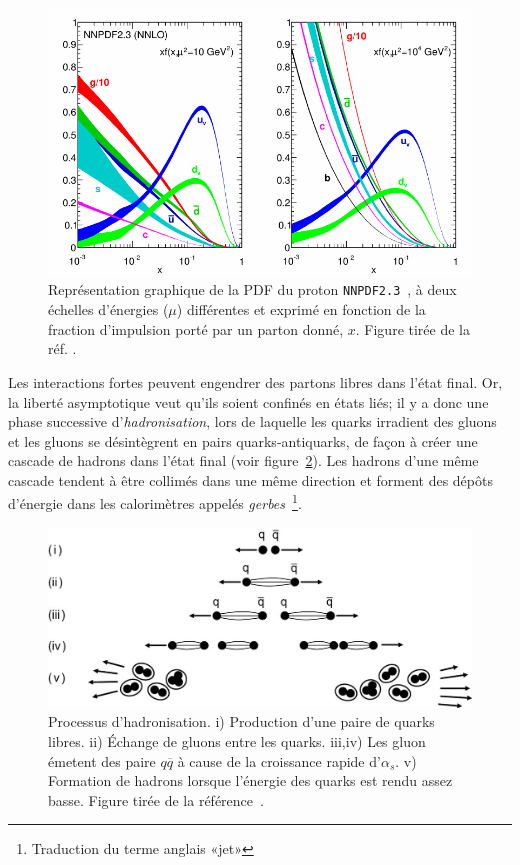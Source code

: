 \begin{figure}
  \centering
  \includegraphics{nnpdf23.pdf}
  \caption{Représentation graphique de la PDF du proton
    \texttt{NNPDF2.3}~\cite{ball_parton_2013}, à deux échelles
    d'énergies ($\mu$) différentes et exprimé en fonction de la
    fraction d'impulsion porté par un parton donné, $x$. Figure tirée de la
    réf. \cite{olive_qcd_2014}.}
  \label{fig:pdf}
\end{figure}

Les interactions fortes peuvent engendrer des partons libres dans l'état
final. Or, la liberté asymptotique veut qu'ils soient confinés en
états liés; il y a donc une phase successive d'\emph{hadronisation},
lors de laquelle les quarks irradient des gluons et les gluons se
désintègrent en pairs quarks-antiquarks, de façon à créer une cascade
de hadrons dans l'état final (voir
figure~\ref{fig:hadronisation}). Les hadrons d'une même cascade
tendent à être collimés dans une même direction et forment des
dépôts d'énergie dans les calorimètres appelés
\emph{gerbes}~\footnote{Traduction du terme anglais
  «jet»}.

\begin{figure}
  \centering
  \includegraphics{hadronisation.jpg}
  \caption{Processus d'hadronisation. i) Production d'une paire de
    quarks libres. ii) Échange de gluons entre les quarks. iii,iv) Les
    gluon émetent des paire $q\overline{q}$ à cause de la croissance
    rapide d'$\alpha_s$. v) Formation de hadrons lorsque l'énergie des
    quarks est rendu assez basse. Figure tirée de la
    référence~\cite{thomson_modern_2013}.}
  \label{fig:hadronisation}
\end{figure}

